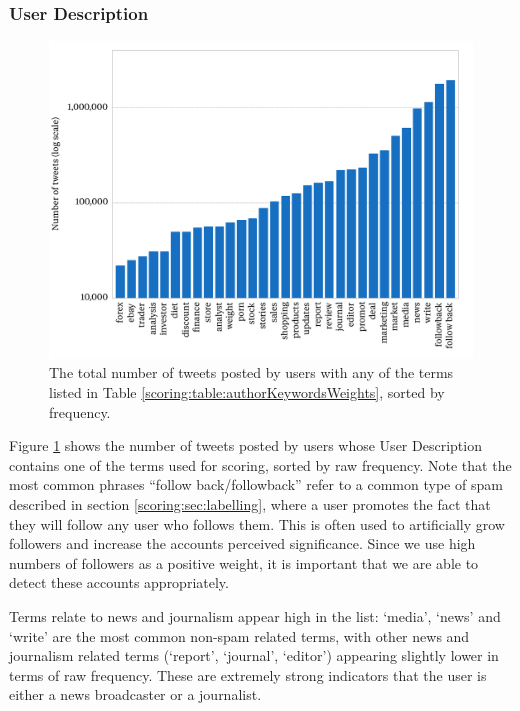 \subsubsection{User Description}
\begin{figure}[t!]
	\centering
	\includegraphics[width=\textwidth]{Chapters/Newsworthiness/data/descterms.pdf}
	\caption{The total number of tweets posted by users with any of the terms listed in Table \ref{scoring:table:authorKeywordsWeights}, sorted by frequency.}
	\label{scoring:graphic:descTerms}
 \end{figure}

Figure \ref{scoring:graphic:descTerms} shows the number of tweets posted by users whose User Description contains one of the terms used for scoring, sorted by raw frequency.
Note that the most common phrases  ``follow back/followback'' refer to a common type of spam described in section \ref{scoring:sec:labelling}, where a user promotes the fact that they will follow any user who follows them.
This is often used to artificially grow followers and increase the accounts perceived significance.
Since we use high numbers of followers as a positive weight, it is important that we are able to detect these accounts appropriately.

Terms relate to news and journalism appear high in the list: `media', `news' and `write' are the most common non-spam related terms, with other news and journalism related terms (`report', `journal', `editor') appearing slightly lower in terms of raw frequency.
These are extremely strong indicators that the user is either a news broadcaster or a journalist.

